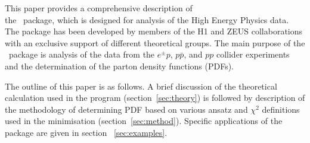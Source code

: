 
This paper provides a comprehensive description of  \\
the \fitter\ package,
which is designed for analysis of the High Energy Physics data.
The package has been developed by members of the H1 and ZEUS collaborations
with an exclusive support of different theoretical groups.
The main purpose of the \fitter\ package is analysis of the 
data from the $e^{\pm}p$, $p\bar{p}$, and $pp$ collider experiments
and the determination of the parton density functions (PDFs).

The outline of this paper is as follows.
A brief discussion of the theoretical calculation
used in the program (section~\ref{sec:theory}) is followed by description of the 
methodology of determining PDF  based on various ansatz and  $\chi^2$ definitions used in the
minimisation (section~\ref{sec:method}). Specific applications of the package are given in
section ~\ref{sec:examples}. 

